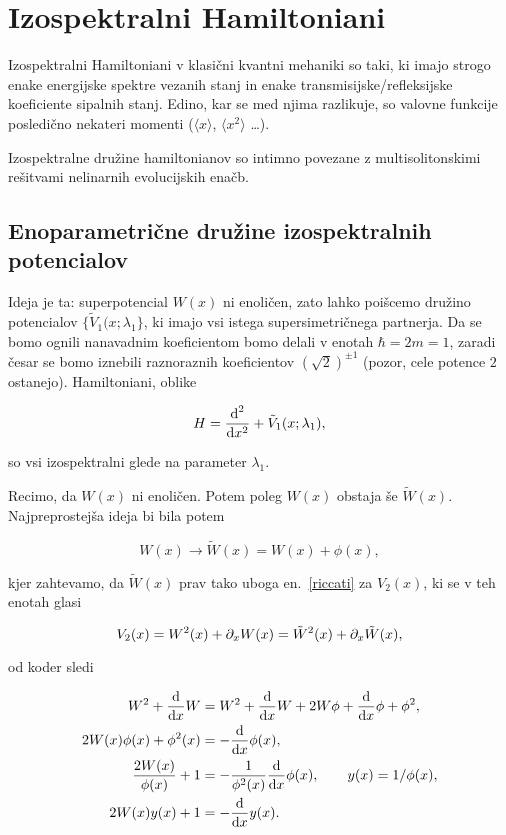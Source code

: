 \section{Izospektralni Hamiltoniani}

Izospektralni Hamiltoniani v klasi\v cni kvantni mehaniki so taki, ki imajo strogo enake energijske
spektre vezanih stanj in enake transmisijske/refleksijske koeficiente sipalnih stanj. Edino, kar se
med njima razlikuje, so valovne funkcije posledi\v cno nekateri momenti ($\langle x \rangle$, $\langle
x^2 \rangle$ \ldots).

Izospektralne dru\v zine hamiltonianov so intimno povezane z multisolitonskimi re\v sitvami nelinarnih
evolucijskih ena\v cb.

\subsection{Enoparametri\v cne dru\v zine izospektralnih potencialov}

Ideja je ta: superpotencial $W(x)$ ni enoli\v cen, zato lahko poi\v scemo dru\v zino potencialov
$\{\tilde{V}_1(x;\lambda_1\}$, ki imajo vsi istega supersimetri\v cnega partnerja. Da se bomo ognili
nanavadnim koeficientom bomo delali v enotah $\hbar = 2m = 1$, zaradi \v cesar se bomo iznebili raznoraznih
koeficientov $(\sqrt{2})^{\pm 1}$ (pozor, cele potence $2$ ostanejo). Hamiltoniani, oblike

\begin{equation}
	H = \frac{\text{d}^2}{\text{d} x^2} + \tilde{V}_1 (x;\lambda_1),
\end{equation}

so vsi izospektralni glede na parameter $\lambda_1$.

Recimo, da $W(x)$ ni enoli\v cen. Potem poleg $W(x)$ obstaja \v se $\tilde{W}(x)$. Najpreprostej\v sa ideja
bi bila potem

\begin{equation}
	W(x) \to \tilde{W}(x) = W(x) + \phi(x),
\end{equation}

kjer zahtevamo, da $\tilde{W}(x)$ prav tako uboga en.~\eqref{riccati} za $V_2(x)$, ki se v teh enotah
glasi

\begin{equation}
	V_2 (x) = W^2(x) + \partial_x W(x) = \tilde{W}^2(x) + \partial_x\tilde{W}(x),
\end{equation}

od koder sledi

\begin{align}
	W^2 + \frac{\text{d}}{\text{d} x} W &= W^2 + \frac{\text{d}}{\text{d} x} W + 2W\phi + \frac{\text{d}}{\text{d} x} \phi + \phi^2, \notag \\
	2W(x)\phi(x) + \phi^2(x) &= -\frac{\text{d}}{\text{d} x} \phi (x), \notag \\
	\frac{2W(x)}{\phi(x)} + 1 &= -\frac{1}{\phi^2(x)}\frac{\text{d}}{\text{d} x}\phi(x),\qquad y(x) = 1/\phi(x), \notag \\
	2W(x)y(x) + 1 &= -\frac{\text{d}}{\text{d} x} y(x).
\end{align}

